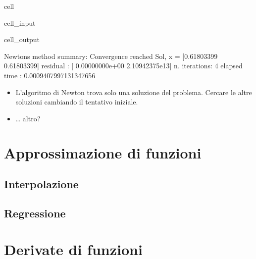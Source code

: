 \documentclass[letterpaper,10pt,italian]{jupyterBook}
\begin{document}
\begin{sphinxuseclass}{cell}
\begin{sphinxVerbatimInput}
\begin{sphinxuseclass}{cell_input}
\end{sphinxuseclass}\end{sphinxVerbatimInput}
\begin{sphinxVerbatimOutput}

\begin{sphinxuseclass}{cell_output}
\begin{sphinxVerbatim}[commandchars=\\\{\}]
Newton\PYGZsq{}s method summary: 
Convergence reached
Sol, x = [\PYGZhy{}0.61803399 \PYGZhy{}0.61803399]
residual     : [ 0.00000000e+00 \PYGZhy{}2.10942375e\PYGZhy{}13]
n. iterations: 4
elapsed time : 0.0009407997131347656
\end{sphinxVerbatim}

\end{sphinxuseclass}\end{sphinxVerbatimOutput}

\end{sphinxuseclass}\begin{itemize}
\item {} 
\sphinxAtStartPar
{} L’algoritmo di Newton trova solo una soluzione del problema. Cercare le altre soluzioni cambiando il tentativo iniziale.

\item {} 
\sphinxAtStartPar
{} … altro?

\end{itemize}

\sphinxstepscope


\chapter{Approssimazione di funzioni}
\label{\detokenize{ch/numerics/approximation:approssimazione-di-funzioni}}\label{\detokenize{ch/numerics/approximation::doc}}

\section{Interpolazione}
\label{\detokenize{ch/numerics/approximation:interpolazione}}

\section{Regressione}
\label{\detokenize{ch/numerics/approximation:regressione}}
\sphinxstepscope


\chapter{Derivate di funzioni}
\label{\detokenize{ch/numerics/derivatives:derivate-di-funzioni}}\label{\detokenize{ch/numerics/derivatives::doc}}
\end{document}
